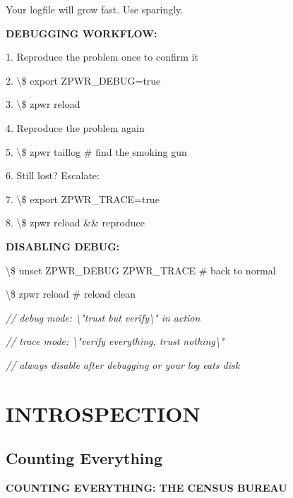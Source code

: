 \documentclass[11pt,a4paper,twoside]{book}
\begin{document}
Your logfile will grow fast. Use sparingly.


\vspace{12pt}
{\bfseries\color{neonyellow} DEBUGGING WORKFLOW:}\vspace{4pt}

1. Reproduce the problem once to confirm it

2. \textbackslash{}\$ export ZPWR\_DEBUG=true

3. \textbackslash{}\$ zpwr reload

4. Reproduce the problem again

5. \textbackslash{}\$ zpwr taillog              \# find the smoking gun

6. Still lost? Escalate:

7. \textbackslash{}\$ export ZPWR\_TRACE=true

8. \textbackslash{}\$ zpwr reload \&\& reproduce


\vspace{12pt}
{\bfseries\color{neonyellow} DISABLING DEBUG:}\vspace{4pt}

\textbackslash{}\$ unset ZPWR\_DEBUG ZPWR\_TRACE  \# back to normal

\begin{codebox}
\textbackslash{}\$ zpwr reload                  \# reload clean\\
\end{codebox}

{\small\itshape\color{dimtext} // debug mode: \textbackslash{}"trust but verify\textbackslash{}" in action}

{\small\itshape\color{dimtext} // trace mode: \textbackslash{}"verify everything, trust nothing\textbackslash{}"}

{\small\itshape\color{dimtext} // always disable after debugging or your log eats disk}


\vspace{16pt}


\chapter{INTROSPECTION}

\section{Counting Everything}


\vspace{10pt}
{\large\bfseries\color{neoncyan} COUNTING EVERYTHING: THE CENSUS BUREAU}\vspace{6pt}
\end{document}
